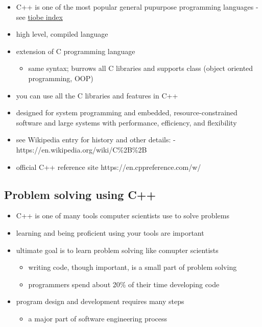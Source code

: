 \documentclass[11pt]{article}
\providecommand{\tightlist}{%
      \setlength{\itemsep}{0pt}\setlength{\parskip}{0pt}}
\begin{document}
\begin{itemize}
\tightlist
\item
  C++ is one of the most popular general pupurpose programming languages
  - see \href{https://www.tiobe.com/tiobe-index/}{tiobe index}
\item
  high level, compiled language
\item
  extension of C programming language

  \begin{itemize}
  \tightlist
  \item
    same syntax; burrows all C libraries and supports class (object
    oriented programming, OOP)
  \end{itemize}
\item
  you can use all the C libraries and features in C++
\item
  designed for system programming and embedded, resource-constrained
  software and large systems with performance, efficiency, and
  flexibility
\item
  see Wikipedia entry for history and other details: -
  https://en.wikipedia.org/wiki/C\%2B\%2B
\item
  official C++ reference site https://en.cppreference.com/w/
\end{itemize}

    \hypertarget{problem-solving-using-c}{%
\subsection{Problem solving using C++}\label{problem-solving-using-c}}

\begin{itemize}
\tightlist
\item
  C++ is one of many tools computer scientists use to solve problems
\item
  learning and being proficient using your tools are important
\item
  ultimate goal is to learn problem solving like comupter scientists

  \begin{itemize}
  \tightlist
  \item
    writing code, though important, is a small part of problem solving
  \item
    programmers spend about 20\% of their time developing code
  \end{itemize}
\item
  program design and development requires many steps

  \begin{itemize}
  \tightlist
  \item
    a major part of software engineering process
  \end{itemize}
\end{itemize}
\end{document}
